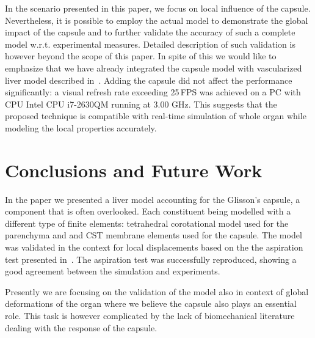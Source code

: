 \documentclass{acm_proc_article-sp}
\newcommand{\TG}[1]{{\color{blue}\textbf{TG: #1}}}
\begin{document}

In the scenario presented in this paper, we focus on local influence of the capsule.
Nevertheless, it is possible to employ the actual model to demonstrate the global 
impact of the capsule and to further validate the accuracy of such a complete model w.r.t. experimental measures. 
Detailed description of such validation is however beyond the scope of this paper. 
In spite of this we would like to emphasize that we have already integrated the
capsule model with vascularized liver model described in~\cite{Peterlik2012}. 
Adding the capsule did not affect the
performance significantly: a visual refresh rate exceeding 25\,FPS was achieved on a
PC with CPU Intel CPU i7-2630QM running at 3.00 GHz.
This suggests that the proposed technique is compatible with real-time simulation of whole
organ while modeling the local properties accurately.



\section{Conclusions and Future Work} %

In the paper we presented a liver model accounting for the Glisson's capsule, a component that is often overlooked. Each constituent being modelled with a different type 
of finite elements: tetrahedral corotational model used for the parenchyma and
and CST membrane elements used for the capsule. 
The model was validated in the context for local displacements based on the the aspiration test presented in~\cite{Hollenstein2006}. The aspiration test
was successfully reproduced, showing a good agreement between the simulation and experiments. 

Presently we are focusing on the validation of the model also in context of
global deformations of the organ where we believe the capsule also plays an
essential role. This task is however complicated by the lack of biomechanical
literature dealing with the response of the capsule.
\end{document}
